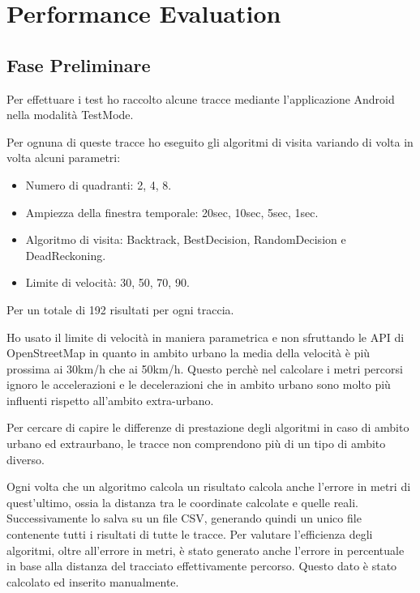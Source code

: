 \documentclass[12pt,a4paper,openright,twoside]{report}
\begin{document}
\clearpage{\pagestyle{empty}\cleardoublepage}
\chapter{Performance Evaluation}                %
\lhead[\fancyplain{}{\bfseries\thepage}]{\fancyplain{}{\bfseries\rightmark}}
\section{Fase Preliminare}
Per effettuare i test ho raccolto alcune tracce mediante l'applicazione Android nella modalità TestMode.

Per ognuna di queste tracce ho eseguito gli algoritmi di visita variando di volta in volta alcuni parametri:
\begin{itemize}
\item Numero di quadranti: 2, 4, 8.
\item Ampiezza della finestra temporale: 20sec, 10sec, 5sec, 1sec.
\item Algoritmo di visita: Backtrack, BestDecision, RandomDecision e DeadReckoning.
\item Limite di velocità: 30, 50, 70, 90.
\end{itemize}
Per un totale di 192 risultati per ogni traccia.

Ho usato il limite di velocità in maniera parametrica e non sfruttando le API di OpenStreetMap in quanto in ambito urbano la media della velocità è più prossima ai 30km/h che ai 50km/h. Questo perchè nel calcolare i metri percorsi ignoro le accelerazioni e le decelerazioni che in ambito urbano sono molto più influenti rispetto all'ambito extra-urbano.

Per cercare di capire le differenze di prestazione degli algoritmi in caso di ambito urbano ed extraurbano, le tracce non comprendono più di un tipo di ambito diverso. 

Ogni volta che un algoritmo calcola un risultato calcola anche l'errore in metri di quest'ultimo, ossia la distanza tra le coordinate calcolate e quelle reali. Successivamente lo salva su un file CSV, generando quindi un unico file contenente tutti i risultati di tutte le tracce.
Per valutare l'efficienza degli algoritmi, oltre all'errore in metri, è stato generato anche l'errore in percentuale in base alla distanza del tracciato effettivamente percorso. Questo dato è stato calcolato ed inserito manualmente.
\end{document}
